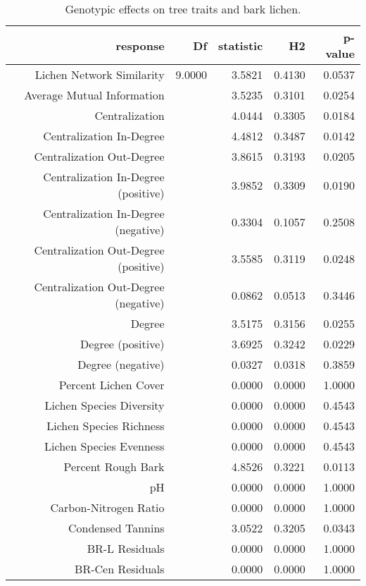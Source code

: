 \begin{table}[ht]
\centering
\begin{tabular}{rrrrr}
  \hline
response & Df & statistic & H2 & p-value \\ 
  \hline
Lichen Network Similarity & 9.0000 & 3.5821 & 0.4130 & 0.0537 \\ 
  Average Mutual Information &  & 3.5235 & 0.3101 & 0.0254 \\ 
  Centralization &  & 4.0444 & 0.3305 & 0.0184 \\ 
  Centralization In-Degree &  & 4.4812 & 0.3487 & 0.0142 \\ 
  Centralization Out-Degree &  & 3.8615 & 0.3193 & 0.0205 \\ 
  Centralization In-Degree (positive) &  & 3.9852 & 0.3309 & 0.0190 \\ 
  Centralization In-Degree (negative) &  & 0.3304 & 0.1057 & 0.2508 \\ 
  Centralization Out-Degree (positive) &  & 3.5585 & 0.3119 & 0.0248 \\ 
  Centralization Out-Degree (negative) &  & 0.0862 & 0.0513 & 0.3446 \\ 
  Degree &  & 3.5175 & 0.3156 & 0.0255 \\ 
  Degree (positive) &  & 3.6925 & 0.3242 & 0.0229 \\ 
  Degree (negative) &  & 0.0327 & 0.0318 & 0.3859 \\ 
  Percent Lichen Cover &  & 0.0000 & 0.0000 & 1.0000 \\ 
  Lichen Species Diversity &  & 0.0000 & 0.0000 & 0.4543 \\ 
  Lichen Species Richness &  & 0.0000 & 0.0000 & 0.4543 \\ 
  Lichen Species Evenness &  & 0.0000 & 0.0000 & 0.4543 \\ 
  Percent Rough Bark &  & 4.8526 & 0.3221 & 0.0113 \\ 
  pH &  & 0.0000 & 0.0000 & 1.0000 \\ 
  Carbon-Nitrogen Ratio &  & 0.0000 & 0.0000 & 1.0000 \\ 
  Condensed Tannins &  & 3.0522 & 0.3205 & 0.0343 \\ 
  BR-L Residuals &  & 0.0000 & 0.0000 & 1.0000 \\ 
  BR-Cen Residuals &  & 0.0000 & 0.0000 & 1.0000 \\ 
   \hline
\end{tabular}
\caption{Genotypic effects on tree traits and bark lichen.} 
\label{tab:h2_table}
\end{table}
